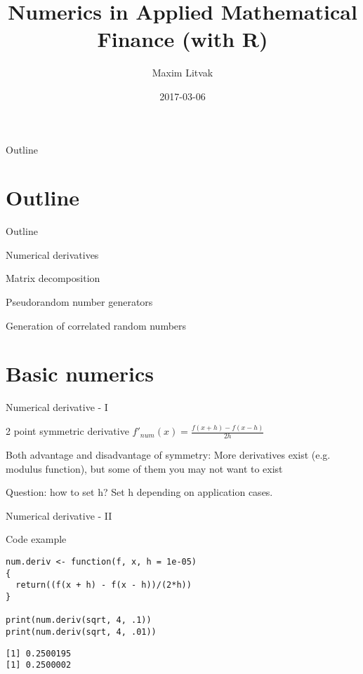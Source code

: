 \documentclass[presentation]{beamer}
\author{Maxim Litvak}
\date{2017-03-06}
\title{Numerics in Applied Mathematical Finance (with R)}
\begin{document}
\maketitle
\begin{frame}{Outline}
\tableofcontents
\end{frame}

\section{Outline}
\label{sec-1}
\begin{frame}[label=sec-1-1]{Outline}
\begin{block}{Numerical derivatives}
\end{block}
\begin{block}{Matrix decomposition}
\end{block}
\begin{block}{Pseudorandom number generators}
\end{block}
\begin{block}{Generation of correlated random numbers}
\end{block}
\end{frame}
\section{Basic numerics}
\label{sec-2}
\begin{frame}[label=sec-2-1]{Numerical derivative - I}
\begin{block}{2 point symmetric derivative}
$f'_{num}(x) = \frac{f(x + h) - f(x - h)}{2h}$
\end{block}
\begin{block}{Both advantage and disadvantage of symmetry:}
More derivatives exist (e.g. modulus function), but some of them you may not want to exist
\end{block}
\begin{block}{Question: how to set h?}
Set h depending on application cases. 
\end{block}
\end{frame}
\begin{frame}[fragile,label=sec-2-2]{Numerical derivative - II}
 \begin{block}{Code example}
\begin{verbatim}
num.deriv <- function(f, x, h = 1e-05)
{
  return((f(x + h) - f(x - h))/(2*h))
}

print(num.deriv(sqrt, 4, .1))
print(num.deriv(sqrt, 4, .01))
\end{verbatim}

\begin{verbatim}
[1] 0.2500195
[1] 0.2500002
\end{verbatim}
\end{block}
\end{frame}
\end{document}
